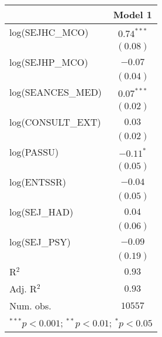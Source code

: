 
\usepackage{booktabs}

\begin{tabular}{l c}
\toprule
 & Model 1 \\
\midrule
log(SEJHC\_MCO)   & $0.74^{***}$ \\
                  & $(0.08)$     \\
log(SEJHP\_MCO)   & $-0.07$      \\
                  & $(0.04)$     \\
log(SEANCES\_MED) & $0.07^{***}$ \\
                  & $(0.02)$     \\
log(CONSULT\_EXT) & $0.03$       \\
                  & $(0.02)$     \\
log(PASSU)        & $-0.11^{*}$  \\
                  & $(0.05)$     \\
log(ENTSSR)       & $-0.04$      \\
                  & $(0.05)$     \\
log(SEJ\_HAD)     & $0.04$       \\
                  & $(0.06)$     \\
log(SEJ\_PSY)     & $-0.09$      \\
                  & $(0.19)$     \\
\midrule
R$^2$             & $0.93$       \\
Adj. R$^2$        & $0.93$       \\
Num. obs.         & $10557$      \\
\bottomrule
\multicolumn{2}{l}{\scriptsize{$^{***}p<0.001$; $^{**}p<0.01$; $^{*}p<0.05$}}
\end{tabular}
